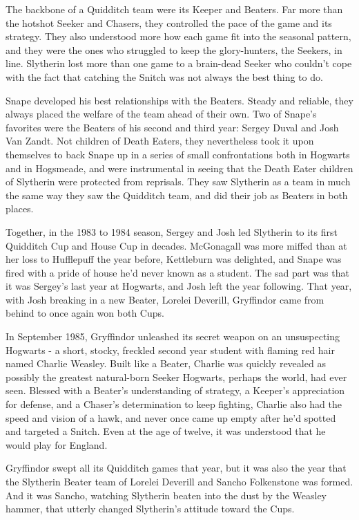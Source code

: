 The backbone of a Quidditch team were its Keeper and Beaters. Far more than the hotshot Seeker and Chasers, they controlled the pace of the game and its strategy. They also understood more how each game fit into the seasonal pattern, and they were the ones who struggled to keep the glory-hunters, the Seekers, in line. Slytherin lost more than one game to a brain-dead Seeker who couldn't cope with the fact that catching the Snitch was not always the best thing to do.

Snape developed his best relationships with the Beaters. Steady and reliable, they always placed the welfare of the team ahead of their own. Two of Snape's favorites were the Beaters of his second and third year: Sergey Duval and Josh Van Zandt. Not children of Death Eaters, they nevertheless took it upon themselves to back Snape up in a series of small confrontations both in Hogwarts and in Hogsmeade, and were instrumental in seeing that the Death Eater children of Slytherin were protected from reprisals. They saw Slytherin as a team in much the same way they saw the Quidditch team, and did their job as Beaters in both places.

Together, in the 1983 to 1984 season, Sergey and Josh led Slytherin to its first Quidditch Cup and House Cup in decades. McGonagall was more miffed than at her loss to Hufflepuff the year before, Kettleburn was delighted, and Snape was fired with a pride of house he'd never known as a student. The sad part was that it was Sergey's last year at Hogwarts, and Josh left the year following. That year, with Josh breaking in a new Beater, Lorelei Deverill, Gryffindor came from behind to once again won both Cups.

In September 1985, Gryffindor unleashed its secret weapon on an unsuspecting Hogwarts - a short, stocky, freckled second year student with flaming red hair named Charlie Weasley. Built like a Beater, Charlie was quickly revealed as possibly the greatest natural-born Seeker Hogwarts, perhaps the world, had ever seen. Blessed with a Beater's understanding of strategy, a Keeper's appreciation for defense, and a Chaser's determination to keep fighting, Charlie also had the speed and vision of a hawk, and never once came up empty after he'd spotted and targeted a Snitch. Even at the age of twelve, it was understood that he would play for England.

Gryffindor swept all its Quidditch games that year, but it was also the year that the Slytherin Beater team of Lorelei Deverill and Sancho Folkenstone was formed. And it was Sancho, watching Slytherin beaten into the dust by the Weasley hammer, that utterly changed Slytherin's attitude toward the Cups.

